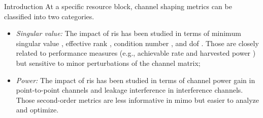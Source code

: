 \documentclass[journal]{IEEEtran}
\begin{document}
\begin{section}{Introduction}
		At a specific resource block, channel shaping metrics can be classified into two categories.
		\begin{itemize}
			\item \emph{Singular value:} The impact of \gls{ris} has been studied in terms of minimum singular value \cite{ElMossallamy2021}, effective rank \cite{Meng2023}, condition number \cite{Huang2023}, and \gls{dof} \cite{Chae2023}. Those are closely related to performance measures (e.g., achievable rate and harvested power \cite{Shen2021}) but sensitive to minor perturbations of the channel matrix;
			\item \emph{Power:} The impact of \gls{ris} has been studied in terms of channel power gain \cite{Wu2019,Shen2020a,Nerini2023,Nerini2024,Santamaria2023} in point-to-point channels and leakage interference \cite{Santamaria2023a} in interference channels. Those second-order metrics are less informative in \gls{mimo} but easier to analyze and optimize.
		\end{itemize}


\end{section}
\end{document}

